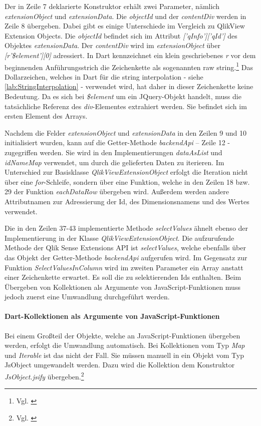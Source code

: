 \newpage
Der in Zeile 7 deklarierte Konstruktor erhält zwei Parameter, nämlich \textit{extensionObject} und \textit{extensionData}. Die \textit{objectId} und der \textit{contentDiv} werden in Zeile 8 übergeben. Dabei gibt es einige Unterschiede im Vergleich zu QlikView Extension Objects. Die \textit{objectId} befindet sich im Attribut \textit{['qInfo']['qId']} des Objektes \textit{extensionData}. Der \textit{contentDiv} wird im \textit{extensionObject} über \textit{[r'\$element'][0]} adressiert. In Dart kennzeichnet ein klein geschriebenes \textit{r} vor dem beginnenden Anführungsstrich die Zeichenkette als sogenannten raw string.\footnote{Vgl. \cite[S. 19]{kopec2014dart}} Das Dollarzeichen, welches in Dart für die string interpolation - siehe \ref{lab:StringInterpolation} - verwendet wird, hat daher in dieser Zeichenkette keine Bedeutung. Da es sich bei \textit{\$element} um ein JQuery-Objekt handelt, muss die tatsächliche Referenz des \textit{div}-Elementes extrahiert werden. Sie befindet sich im ersten Element des Arrays.

Nachdem die Felder \textit{extensionObject} und \textit{extensionData} in den Zeilen 9 und 10 initialisiert wurden, kann auf die Getter-Methode \textit{backendApi} – Zeile 12 - zugegriffen werden. Sie wird in den Implementierungen \textit{dataAsList} und \textit{idNameMap} verwendet, um durch die gelieferten Daten zu iterieren. Im Unterschied zur Basisklasse \textit{QlikViewExtensionObject} erfolgt die Iteration nicht über eine \textit{for}-Schleife, sondern über eine Funktion, welche in den Zeilen 18 bzw. 29 der Funktion \textit{eachDataRow} übergeben wird. Außerdem werden andere Attributnamen zur Adressierung der Id, des Dimensionsnamens und des Wertes verwendet.

Die in den Zeilen 37-43 implementierte Methode \textit{selectValues} ähnelt ebenso der Implementierung in der Klasse \textit{QlikViewExtensionObject}. Die aufzurufende Methode der Qlik Sense Extensions API ist \textit{selectValues}, welche ebenfalls über das Objekt der Getter-Methode \textit{backendApi} aufgerufen wird. Im Gegensatz zur Funktion \textit{SelectValuesInColumn} wird im zweiten Parameter ein Array anstatt einer Zeichenkette erwartet. Es soll die zu selektierenden Ids enthalten. Beim Übergeben von Kollektionen als Argumente von JavaScript-Funktionen muss jedoch zuerst eine Umwandlung durchgeführt werden.

\newpage
\paragraph{Dart-Kollektionen als Argumente von JavaScript-Funktionen}
Bei einem Großteil der Objekte, welche an JavaScript-Funktionen übergeben werden, erfolgt die Umwandlung automatisch. Bei Kollektionen vom Typ \textit{Map} und \textit{Iterable} ist das nicht der Fall. Sie müssen manuell in ein Objekt vom Typ JsObject umgewandelt werden. Dazu wird die Kollektion dem Konstruktor \textit{JsObject.jsify} übergeben.\footnote{Vgl. \cite{JsObjectJsify}}


